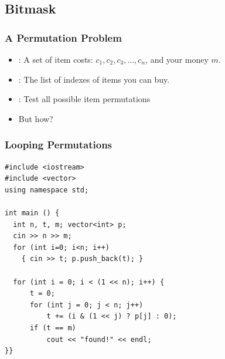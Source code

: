\documentclass{beamer}
\begin{document}
\subsection{Bitmask}

\begin{frame}
  \frametitle{A Permutation Problem}
  \begin{itemize}
    \item {}: A set of item costs: $c_1, c_2, c_3, \ldots, c_n$, and your money $m$.
    \bigskip

    \item {}: The list of indexes of items you can buy.
    \bigskip

    \item {}: Test all possible \alert{item permutations}
    \bigskip

    \item But how?
  \end{itemize}
\end{frame}

\begin{frame}[fragile]
  \frametitle{Looping Permutations}

{\small
  \begin{block}{}
\begin{verbatim}
#include <iostream>
#include <vector>
using namespace std;

int main () {
  int n, t, m; vector<int> p;
  cin >> n >> m;
  for (int i=0; i<n; i++)
    { cin >> t; p.push_back(t); }

  for (int i = 0; i < (1 << n); i++) {
      t = 0;
      for (int j = 0; j < n; j++)
          t += (i & (1 << j) ? p[j] : 0);
      if (t == m)
          cout << "found!" << endl;
}}
\end{verbatim}
\end{block}}
\end{frame}
\end{document}
